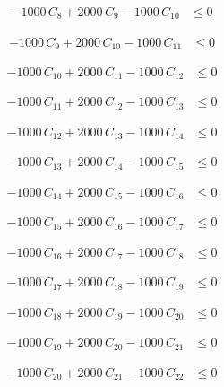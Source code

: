 \documentclass[a4paper,11pt]{article}
\begin{document}
\begin{align}
-1000\,C_{8} + 2000\,C_{9} - 1000\,C_{10} &\leq 0 \nonumber
\end{align}

\begin{align}
-1000\,C_{9} + 2000\,C_{10} - 1000\,C_{11} &\leq 0 \nonumber
\end{align}

\begin{align}
-1000\,C_{10} + 2000\,C_{11} - 1000\,C_{12} &\leq 0 \nonumber
\end{align}

\begin{align}
-1000\,C_{11} + 2000\,C_{12} - 1000\,C_{13} &\leq 0 \nonumber
\end{align}

\begin{align}
-1000\,C_{12} + 2000\,C_{13} - 1000\,C_{14} &\leq 0 \nonumber
\end{align}

\begin{align}
-1000\,C_{13} + 2000\,C_{14} - 1000\,C_{15} &\leq 0 \nonumber
\end{align}

\begin{align}
-1000\,C_{14} + 2000\,C_{15} - 1000\,C_{16} &\leq 0 \nonumber
\end{align}

\begin{align}
-1000\,C_{15} + 2000\,C_{16} - 1000\,C_{17} &\leq 0 \nonumber
\end{align}

\begin{align}
-1000\,C_{16} + 2000\,C_{17} - 1000\,C_{18} &\leq 0 \nonumber
\end{align}

\begin{align}
-1000\,C_{17} + 2000\,C_{18} - 1000\,C_{19} &\leq 0 \nonumber
\end{align}

\begin{align}
-1000\,C_{18} + 2000\,C_{19} - 1000\,C_{20} &\leq 0 \nonumber
\end{align}

\begin{align}
-1000\,C_{19} + 2000\,C_{20} - 1000\,C_{21} &\leq 0 \nonumber
\end{align}

\begin{align}
-1000\,C_{20} + 2000\,C_{21} - 1000\,C_{22} &\leq 0 \nonumber
\end{align}
\end{document}
